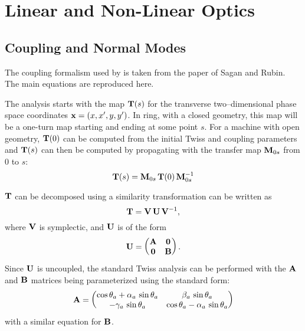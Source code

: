 \chapter{Linear and Non-Linear Optics}

\section{Coupling and Normal Modes}
\label{s:coupling}

The coupling formalism used by \bmad is taken from the paper of Sagan and Rubin\cite{b:coupling}.
The main equations are reproduced here.

The analysis starts with the map ${\bf T}(s)$ for the transverse two--dimensional phase space
coordinates ${\bf x} = (x, x', y, y')$. In ring, with a closed geometry, this map will be a one-turn
map starting and ending at some point $s$. For a machine with open geometry, ${\bf T}(0)$ can be
computed from the initial Twiss and coupling parameters and ${\bf T}(s)$ can then be computed by
propagating with the transfer map ${\bf M}_{0s}$ from $0$ to $s$:
\begin{equation}
    {\bf T}(s) = {\bf M}_{0s} \, {\bf T}(0) \, {\bf M}_{0s}^{-1}
\end{equation}

${\bf T}$ can be decomposed using a similarity transformation
 can be written as
  \begin{equation}
    {\bf T} = {\bf V} \, {\bf U} \, {\bf V}^{-1} 
    , \label{tvuv}
  \end{equation} 
where ${\bf V}$ is symplectic, and ${\bf U}$ is of the form
  \begin{equation}
    {\bf U} =
    \begin{pmatrix}
      {\bf A} & {\bf 0} \cr 
      {\bf 0} & {\bf B} \cr
    \end{pmatrix}
    . \label{ua00b}
  \end{equation}
Since ${\bf U}$ is uncoupled, the standard Twiss analysis can be performed with the ${\bf A}$ and ${\bf B}$
matrices being parameterized using the standard form:
\begin{equation}
  {\bf A} = \begin{pmatrix}
    \cos\theta_a + \alpha_a \, \sin\theta_a & \beta_a \, \sin\theta_a \\
    -\gamma_a \, \sin\theta_a & \cos\theta_a - \alpha_a \, \sin\theta_a
    \end{pmatrix}
\end{equation}
with a similar equation for ${\bf B}$. 

